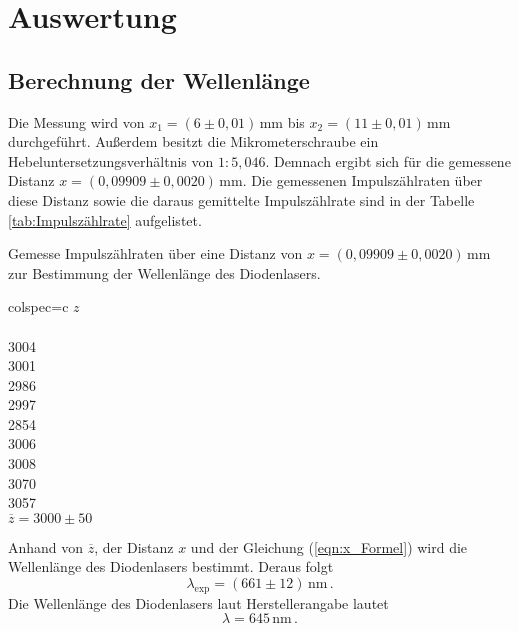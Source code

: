 \section{Auswertung}
\label{sec:Auswertung}
\subsection{Berechnung der Wellenlänge}
Die Messung wird von $x_1 = (6 \pm 0,01)\,\unit{\milli\metre}$ bis $x_2 = (11 \pm 0,01)\,\unit{\milli\metre}$ durchgeführt. Außerdem besitzt die Mikrometerschraube ein Hebeluntersetzungsverhältnis von 
$1 : 5,046$.  Demnach ergibt sich für die gemessene Distanz $x = (0,09909\pm 0,0020) \,\unit{\milli\metre}$. Die gemessenen Impulszählraten über diese Distanz sowie die daraus gemittelte Impulszählrate
sind in der Tabelle \ref{tab:Impulszählrate} aufgelistet.
\begin{table}[H]
    \centering
    \caption{Gemesse Impulszählraten über eine Distanz von $x = (0,09909\pm 0,0020) \,\unit{\milli\metre}$ zur Bestimmung der Wellenlänge des Diodenlasers.}
    \label{tab:Impulszählrate}
    \begin{tblr}{colspec={c}}
        \toprule
        $z$\\
        \\
        3004\\
        3001\\
        2986\\
        2997\\
        2854\\
        3006\\
        3008\\
        3070\\
        3057\\
        \midrule
        $\overline{z} = 3000\pm50$\\
        \bottomrule
    \end{tblr}
\end{table}
Anhand von $\overline{z}$, der Distanz $x$ und der Gleichung (\ref{eqn:x_Formel}) wird die Wellenlänge des Diodenlasers bestimmt. Deraus folgt
$$\lambda _{\text{exp}} = (661 \pm 12)\,\unit{\nano\metre}\,.$$
Die Wellenlänge des Diodenlasers laut Herstellerangabe lautet
$$\lambda = 645\,\unit{\nano\metre}\,.$$


